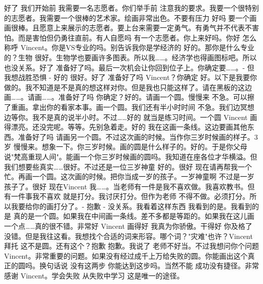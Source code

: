 好了 我们开始前 我需要一名志愿者。你们举手前 注意我的要求。我要一个很特别的志愿者。我需要一个很棒的艺术家。绘画非常出色。不要有压力 好吗 要一个画画很棒。且愿意上来展示的志愿者。要上台来需要一定勇气。有勇气并不代表不害怕。而是害怕但仍勇往直前。有人自愿吗 有一个志愿者。你上来好吗。你好 怎么称呼 Vincent。你是VS专业的吗。别告诉我你是学经济的 好的。那你是什么专业的？生物 很好。生物学也要画许多图表。所以我……。经济学也得画图标吧。所以也没关系。好了 准备好了吗。最后一次机会让你回到位子上。你确定要……。- 但我想战胜恐惧 - 好的 很好。好了 准备好了吗 Vincent？你确定 好。以下是我要你做的。我不知道是不是真的想这样对你。但是我也只能这样了。请在黑板的这边画……。请画……。准备好了吗 你确定？好的。请画一个圆。慢慢来 不急。可以擦了重画。拿出你的看家本事。画一个圆。我们还有半小时时间 不急。我们边冥想边等你。我不是真的说半小时。不过……好的 就当是练习时间。一个圆 Vincent 画得漂亮。还没完呢。等等。先别急着走。好的 我在这画一条线。这边要画其他东西。准备好了吗 请画另一个圆。不过这次画的时候。当作你三岁时候画的样子。3岁 慢慢来。想象一下。你三岁时候。画的圆是什么样子的。好的。于是你父母说"梵高重现人间"。能画一个你三岁时候画的圆吗。我知道在座各位才华横溢。但我们想要些真实……很好。不过还是一位三岁神童 好的。很好 现在请再帮我一个忙。再画一个圆。这次画的时候。把你当成一岁的孩子。一岁神童啊 不过是一岁孩子了。很好 现在Vincent 我……。当老师有一件是我不喜欢做。我喜欢教书。但有一件事我不喜欢 就是打分。我讨厌打分。但作为老师 不得不做。必须打分。所以我要给你的画打分了。- 抱歉 - 没关系。我看着这样东西 我看到的是。我看到的是 真的是一个圆。如果我在中间画一条线。差不多都是等距的。如果我在这儿画一个点……真的很不错。非常好 Vincent 画得好 我真为你骄傲。干得好 你及格了 没错。但是我往这看。我想找个合适的词来形容。哪个词？"灾难"也许？Vincent 拜托 这不是圆。还有这个？抱歉 抱歉。我说了 老师不好当。不过我想问你个问题 Vincent。非常重要的问题。如果没有经过成千上万给失败的圆。你能画出这个真正的圆吗。换句话说 没有这两步 你能达到这步吗。当然不能 成功没有捷径。非常感谢 Vincent。学会失败 从失败中学习 这是唯一的途径。 

